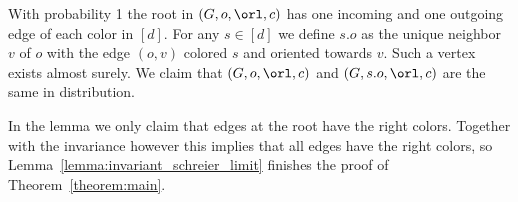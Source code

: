 \begin{lemm}\label{lemma:invariant_schreier_limit}
With probability 1 the root in $(G,o,\orl, c)$ has one incoming and one outgoing edge of each color in $[d]$. For any $s \in [d]$ we define $s.o$ as the unique neighbor $v$ of $o$ with the edge $(o,v)$ colored $s$ and oriented towards $v$. Such a vertex exists almost surely. We claim that $(G,o,\orl,c)$ and $(G,s.o,\orl,c)$ are the same in distribution.
\end{lemm}

In the lemma we only claim that edges at the root have the right colors. Together with the invariance however this implies that all edges have the right colors, so Lemma~\ref{lemma:invariant_schreier_limit} finishes the proof of Theorem~\ref{theorem:main}.


